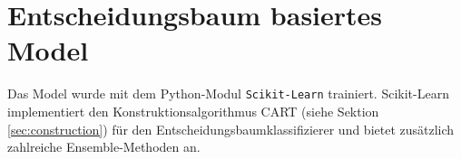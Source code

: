 \section{Entscheidungsbaum basiertes Model}
Das Model wurde mit dem Python-Modul \texttt{Scikit-Learn} trainiert. Scikit-Learn implementiert den Konstruktionsalgorithmus CART (siehe Sektion \ref{sec:construction}) für den Entscheidungsbaumklassifizierer und bietet
zusätzlich zahlreiche Ensemble-Methoden an.

